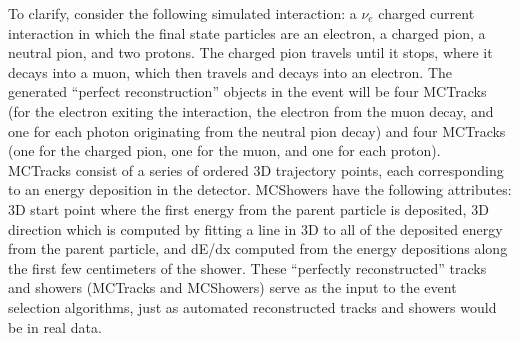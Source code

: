 To clarify, consider the following simulated interaction: a $\nu_e$ charged current interaction in which the final state particles are an electron, a charged pion, a neutral pion, and two protons. The charged pion travels until it stops, where it decays into a muon, which then travels and decays into an electron. The generated ``perfect reconstruction'' objects in the event will be four {\sc MCTracks} (for the electron exiting the interaction, the electron from the muon decay, and one for each photon originating from the neutral pion decay) and four {\sc MCTracks} (one for the charged pion, one for the muon, and one for each proton).\\

{\sc MCTracks} consist of a series of ordered 3D trajectory points, each corresponding to an energy deposition in the detector. {\sc MCShowers} have the following attributes: 3D start point where the first energy from the parent particle is deposited, 3D direction which is computed by fitting a line in 3D to all of the deposited energy from the parent particle, and dE/dx computed from the energy depositions along the first few centimeters of the shower. These ``perfectly reconstructed'' tracks and showers ({\sc MCTracks} and {\sc MCShowers}) serve as the input to the event selection algorithms, just as automated reconstructed tracks and showers would be in real data.\\




